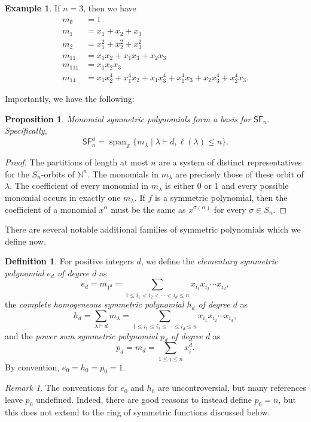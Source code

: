 \documentclass[12pt]{article}
\theoremstyle{plain}
\newtheorem{proposition}[theorem]{Proposition}
\theoremstyle{definition}
\newtheorem{definition}[theorem]{Definition}
\newtheorem{example}[theorem]{Example}
\theoremstyle{remark}
\newtheorem{remark}[theorem]{Remark}
\numberwithin{equation}{section}
\begin{document}
\begin{example}
If $n=3$, then we have
\begin{align*}
m_\emptyset &= 1\\
m_1 &= x_1 + x_2 + x_3\\
m_2 &= x_1^2 + x_2^2 + x_3^2\\
m_{11} &= x_1x_2 + x_1x_3 + x_2x_3\\
m_{111} &= x_1x_2x_3 \\
m_{14} &= x_1x_2^4 + x_1^4x_2 + x_1x_3^4 + x_1^4x_3 + x_2x_3^4 +
x_2^4x_3.
\end{align*}
\end{example}

Importantly, we have the following:

\begin{proposition}
Monomial symmetric polynomials form a basis for $\mathsf{SF}_n$.
Specifically,
\[
\mathsf{SF}_n^d = \operatorname{span}_{\mathbb{Z}}
\{ m_\lambda \mid \lambda \vdash d, \ell(\lambda) \le n \}.
\]
\end{proposition}

\begin{proof}
The partitions of length at most $n$ are a system of distinct
representatives for the $S_n$-orbits of $\mathbb{N}^n$.
The monomials in $m_\lambda$ are precisely those of these orbit of
$\lambda$.
The coefficient of every monomial
in $m_\lambda$ is either $0$ or $1$ and every possible monomial
occurs in exactly one $m_\lambda$.
If $f$ is a symmetric polynomial, then the coefficient
of a monomial $x^\alpha$ must be the same as $x^{\sigma(\alpha)}$
for every $\sigma \in S_n$.  
\end{proof}

There are several notable additional families of symmetric polynomials
which we define now.

\begin{definition}
For positive integers $d$, we define
the \emph{elementary symmetric polynomial $e_d$ of degree $d$} as
\[
e_d = m_{1^d} = \sum_{1 \le i_1 < i_2 < \cdots < i_d \le n} x_{i_1}x_{i_2}\cdots
x_{i_d},
\]
the \emph{complete homogeneous symmetric polynomial $h_d$ of degree $d$} as
\[
h_d = \sum_{\lambda \vdash d} m_\lambda = \sum_{1 \le i_1 \le i_2 \le \cdots \le i_d \le n} x_{i_1}x_{i_2}\cdots
x_{i_d},
\]
and the \emph{power sum symmetric polynomial $p_d$ of degree $d$} as
\[
p_d = m_d = \sum_{1 \le i \le n} x_i^d.
\]
By convention, $e_0=h_0=p_0=1$.
\end{definition}

\begin{remark}
The conventions for $e_0$ and $h_0$ are uncontroversial,
but many references leave $p_0$ undefined.
Indeed, there are good reasons to instead define $p_0=n$, but this does not
extend to the ring of symmetric functions discussed below. 
\end{remark}
\end{document}
